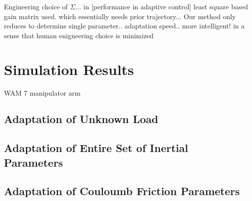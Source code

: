 \documentclass[letterpaper, 10 pt, conference]{ieeeconf}  %
\newtheorem{remark}{Remark}
\begin{document}
Engineering choice of $\Sigma$... in [performance in adaptive control] least square based gain matrix used. which essentially needs prior trajectory... Our method only reduces to determine single parameter.. adaptation speed.. more intelligent! in a sense that human enigneering choice is minimized
\section{Simulation Results}
WAM 7 manipulator arm
\subsection{Adaptation of Unknown Load}
\newpage
\subsection{Adaptation of Entire Set of Inertial Parameters}
\newpage
\subsection{Adaptation of Couloumb Friction Parameters}
\newpage

\end{document}
